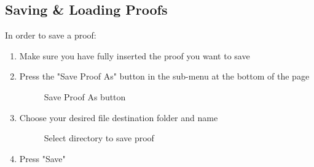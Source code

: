 \subsection{Saving \& Loading Proofs}

In order to save a proof:

\begin{enumerate}
	\item Make sure you have fully inserted the proof you want to save
	\item Press the "Save Proof As" button in the sub-menu at the bottom of the page
	
	\begin{figure}[!ht]
		\centering
		\caption{Save Proof As button}
	\end{figure}
	\item Choose your desired file destination folder and name
	
	\begin{figure}[!ht]
		\centering
		\caption{Select directory to save proof}
	\end{figure}

	\item Press "Save"
\end{enumerate}

